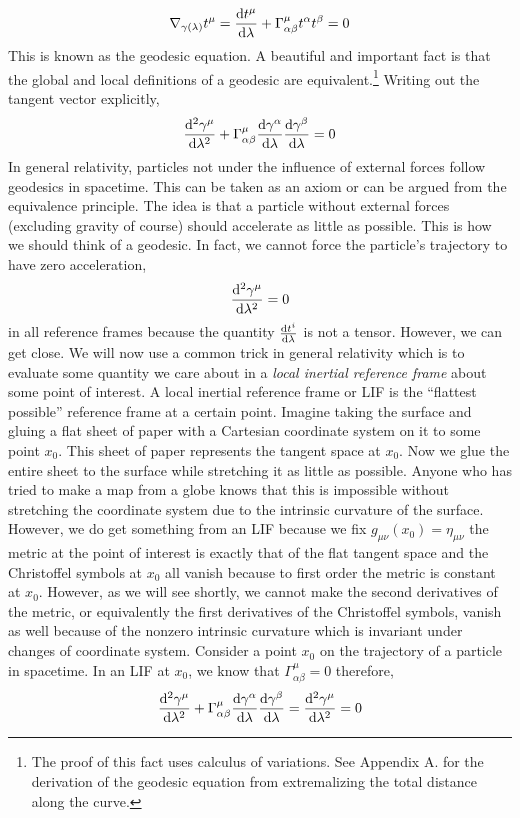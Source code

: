 \documentclass[11pt, a4paper]{article}
\begin{document}
\[ \nabla_{\gamma(\lambda)} t^{\mu} = \frac{\mathrm{d}t^\mu}{\mathrm{d}\lambda} +  \Gamma^\mu_{\alpha \beta} t^\alpha t^\beta  = 0\] 
This is known as the geodesic equation. A beautiful and important fact is that the global and local definitions of a geodesic are equivalent.\footnote{The proof of this fact uses calculus of variations. See Appendix A. for the derivation of the geodesic equation from extremalizing the total distance along the curve.} Writing out the tangent vector explicitly,
\[ \frac{\mathrm{d}^{2} \gamma^\mu}{\mathrm{d}\lambda^{2}} + \Gamma^{\mu}_{\alpha \beta} \frac{\mathrm{d}\gamma^\alpha}{\mathrm{d}\lambda} \frac{\mathrm{d}\gamma^\beta}{\mathrm{d}\lambda}  = 0\]
In general relativity, particles not under the influence of external forces follow geodesics in spacetime. This can be taken as an axiom or can be argued from the equivalence principle. The idea is that a particle without external forces (excluding gravity of course) should accelerate as little as possible. This is how we should think of a geodesic. In fact, we cannot force the particle's trajectory to have zero acceleration,
\[ \frac{\mathrm{d}^{2} \gamma^\mu}{\mathrm{d}\lambda^{2}} = 0\]
in all reference frames because the quantity $\frac{\mathrm{d}t^i}{\mathrm{d}\lambda}$ is not a tensor. However, we can get close. We will now use a common trick in general relativity which is to evaluate some quantity we care about in a \textit{local inertial reference frame} about some point of interest. A local inertial reference frame or LIF is the ``flattest possible'' reference frame at a certain point. Imagine taking the surface and gluing a flat sheet of paper with a Cartesian coordinate system on it to some point $x_0$. This sheet of paper represents the tangent space at $x_0$. Now we glue the entire sheet to the surface while stretching it as little as possible. Anyone who has tried to make a map from a globe knows that this is impossible without stretching the coordinate system due to the intrinsic curvature of the surface. However, we do get something from an LIF because we fix $g_{\mu\nu}(x_0) = \eta_{\mu \nu}$ the metric at the point of interest is exactly that of the flat tangent space and the Christoffel symbols at $x_0$ all  vanish because to first order the metric is constant at $x_0$. However, as we will see shortly, we cannot make the second derivatives of the metric, or equivalently the first derivatives of the Christoffel symbols, vanish as well because of the nonzero intrinsic curvature which is invariant under changes of coordinate system. Consider a point $x_0$ on the trajectory of a particle in spacetime. In an LIF at $x_0$, we know that $\Gamma^{\mu}_{\alpha \beta} = 0$ therefore, 
\[ \frac{\mathrm{d}^{2} \gamma^\mu}{\mathrm{d}\lambda^{2}} + \Gamma^{\mu}_{\alpha \beta} \frac{\mathrm{d}\gamma^\alpha}{\mathrm{d}\lambda} \frac{\mathrm{d}\gamma^\beta}{\mathrm{d}\lambda} = \frac{\mathrm{d}^{2} \gamma^\mu}{\mathrm{d}\lambda^{2}} = 0\]
\end{document}
